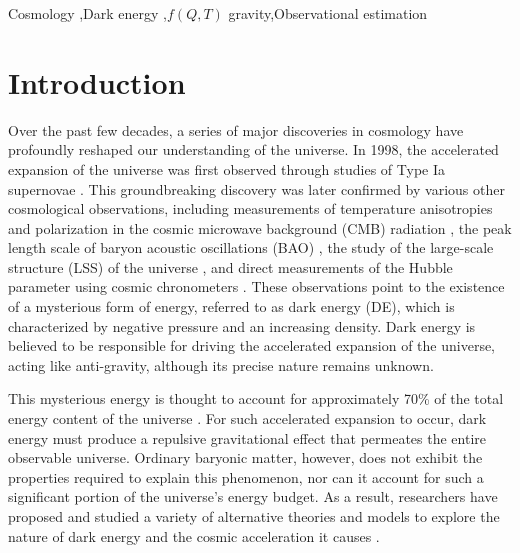 \documentclass[a4paper,fleqn]{cas-sc}
\begin{document}


\begin{keywords}
Cosmology \sep Dark energy \sep $f(Q,T)$ gravity\sep Observational estimation
\end{keywords}

\maketitle

\section{Introduction} \label{sec:intro}

Over the past few decades, a series of major discoveries in cosmology have profoundly reshaped our understanding of the universe. In 1998, the accelerated expansion of the universe was first observed through studies of Type Ia supernovae \cite{perlmutter_discovery_1998, Riess_1998}. This groundbreaking discovery was later confirmed by various other cosmological observations, including measurements of temperature anisotropies and polarization in the cosmic microwave background (CMB) radiation \cite{1992ApJ...396L...1S, 2020Planck}, the peak length scale of baryon acoustic oscillations (BAO) \cite{Eisenstein_2005, 10.1111/j.1365-2966.2011.19592.x}, the study of the large-scale structure (LSS) of the universe \cite{Dodelson_2002, Percival_2007}, and direct measurements of the Hubble parameter using cosmic chronometers \cite{Daniel_Stern_2010, Moresco_2015}. These observations point to the existence of a mysterious form of energy, referred to as dark energy (DE), which is characterized by negative pressure and an increasing density. Dark energy is believed to be responsible for driving the accelerated expansion of the universe, acting like anti-gravity, although its precise nature remains unknown.

This mysterious energy is thought to account for approximately 70\% of the total energy content of the universe \cite{PhysRevD.37.3406, PhysRevD.63.103510, 10.1143/PTP.106.929}. For such accelerated expansion to occur, dark energy must produce a repulsive gravitational effect that permeates the entire observable universe. Ordinary baryonic matter, however, does not exhibit the properties required to explain this phenomenon, nor can it account for such a significant portion of the universe's energy budget. As a result, researchers have proposed and studied a variety of alternative theories and models to explore the nature of dark energy and the cosmic acceleration it causes \cite{10.1093/oso/9780198526827.001.0001}.
\end{document}
